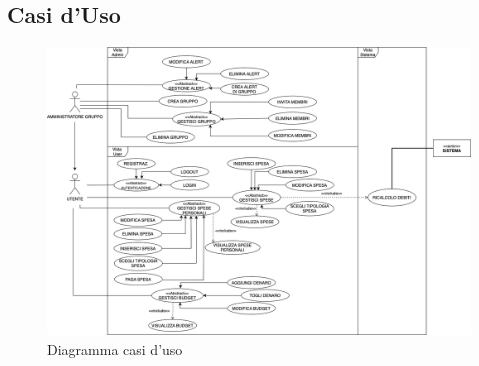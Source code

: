 \subsection{Casi d'Uso}

    \begin{figure}[h]
        \centering
        \includegraphics[width=1.1\textwidth, trim=3cm 0cm 1cm 0cm]{images/DiagrammaCasiDusoV1.3.png}
        \caption{Diagramma casi d'uso }
    \end{figure}

